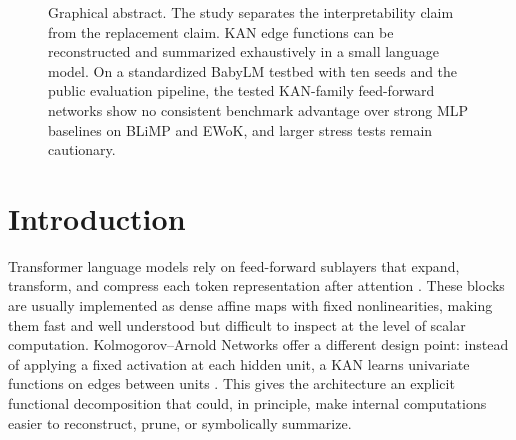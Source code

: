 \documentclass[11pt]{article}
\newcommand{\modelname}[1]{\textsc{#1}}
\newcommand{\grkan}{\modelname{GR-KAN}}
\newcommand{\mlpedge}{\modelname{MLPEdge}}
\begin{document}
\begin{figure}[t]
\centering
{}
\caption{Graphical abstract. The study separates the interpretability claim from the replacement claim. KAN edge functions can be reconstructed and summarized exhaustively in a small language model. On a standardized BabyLM testbed with ten seeds and the public evaluation pipeline, the tested KAN-family feed-forward networks show no consistent benchmark advantage over strong MLP baselines on BLiMP and EWoK, and larger stress tests remain cautionary.}
\label{fig:graphical-abstract}
\end{figure}

\section{Introduction}

Transformer language models rely on feed-forward sublayers that expand, transform, and compress each token representation after attention \cite{vaswani2017attention}. These blocks are usually implemented as dense affine maps with fixed nonlinearities, making them fast and well understood but difficult to inspect at the level of scalar computation. Kolmogorov--Arnold Networks offer a different design point: instead of applying a fixed activation at each hidden unit, a KAN learns univariate functions on edges between units \cite{liu2024kan}. This gives the architecture an explicit functional decomposition that could, in principle, make internal computations easier to reconstruct, prune, or symbolically summarize.
\end{document}

